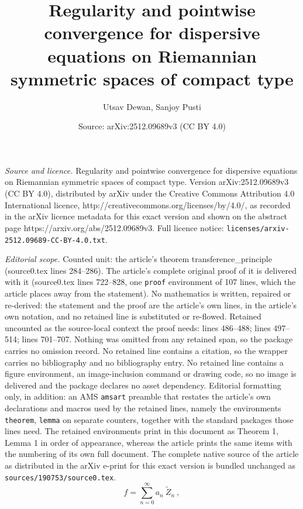 \documentclass[10pt,a4paper]{amsart}
\title{Regularity and pointwise convergence for dispersive equations on Riemannian symmetric spaces of compact type}
\author{Utsav Dewan, Sanjoy Pusti}
\date{Source: arXiv:2512.09689v3 (CC BY 4.0)}
\begin{document}
\maketitle

\noindent\emph{Source and licence.} Regularity and pointwise convergence for dispersive equations on Riemannian symmetric spaces of compact type. Version arXiv:2512.09689v3 (CC BY 4.0), distributed by arXiv under the Creative Commons Attribution 4.0 International licence, http://creativecommons.org/licenses/by/4.0/, as recorded in the arXiv licence metadata for this exact version and shown on the abstract page https://arxiv.org/abs/2512.09689v3. Full licence notice: \texttt{licenses/arxiv-2512.09689-CC-BY-4.0.txt}.\par\smallskip

\noindent\textit{Editorial scope.} Counted unit: the article's theorem transference\_principle (source0.tex lines 284--286). The article's complete original proof of it is delivered with it (source0.tex lines 722--828, one \texttt{proof} environment of 107 lines, which the article places away from the statement). No mathematics is written, repaired or re-derived: the statement and the proof are the article's own lines, in the article's own notation, and no retained line is substituted or re-flowed.  Retained uncounted as the source-local context the proof needs: lines 486--488; lines 497--514; lines 701--707.  Nothing was omitted from any retained span, so the package carries no omission record.  No retained line contains a citation, so the wrapper carries no bibliography and no bibliography entry.  No retained line contains a figure environment, an image-inclusion command or drawing code, so no image is delivered and the package declares no asset dependency.  Editorial formatting only, in addition: an AMS \texttt{amsart} preamble that restates the article's own declarations and macros used by the retained lines, namely the environments \texttt{theorem}, \texttt{lemma} on separate counters, together with the standard packages those lines need.  The retained environments print in this document as Theorem 1, Lemma 1 in order of appearance, whereas the article prints the same items with the numbering of its own full document.  The complete native source of the article as distributed in the arXiv e-print for this exact version is bundled unchanged as \texttt{sources/190753/source0.tex}.
\begin{equation} \label{spherical_fourier_series}
f=\sum_{n=0}^\infty a_n\:\tilde{Z}_n\:,
\end{equation}
\end{document}

